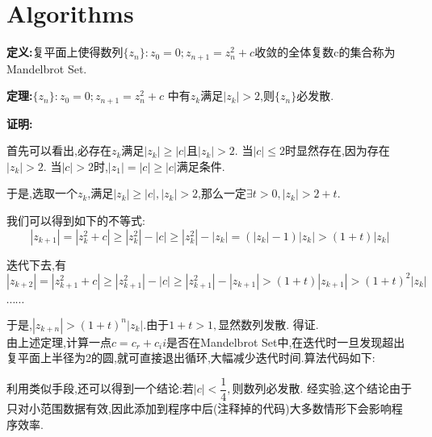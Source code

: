 \section{Algorithms}
\label{sec:algorithms}

{\bf 定义:}复平面上使得数列$ \{z_n\}: z_0 = 0; z_{n+1} = z_n^2 + c$收敛的全体复数c的集合称为Mandelbrot Set.

{\bf 定理:}$ \{z_n\}: z_0 = 0; z_{n+1} = z_n^2 + c $ 中有$ z_k $满足$ |z_k| > 2$,则$ \{ z_n\}$必发散.

{\bf 证明:}

首先可以看出,必存在$ z_k$满足$ |z_k| \ge |c|$且$ |z_k| > 2$. 当$ |c| \le 2$时显然存在,因为存在$ |z_k| > 2$.
当$ |c| > 2$时,$ |z_1| = |c| \ge |c|$满足条件.

于是,选取一个$ z_k$,满足$ |z_k| \ge |c|, |z_k| > 2$,那么一定$ \exists t > 0, |z_k| > 2 + t.$

我们可以得到如下的不等式:
\[ |z_{k+1}| = |z_k^2 + c| \ge |z_k^2| - |c| \ge |z_k^2| - |z_k| = (|z_k| - 1)|z_k| > (1 + t)|z_k| \]

迭代下去,有
\[ |z_{k+2}| = |z_{k+1}^2 + c| \ge |z_{k+1}^2| - |c| \ge |z_{k+1}^2| - |z_{k+1}| > (1+t)|z_{k+1}| > (1+t)^2|z_k|\]

$ \cdots \cdots$ 

于是,$ |z_{k+n}| > (1+t)^n|z_k|.$由于$ 1 + t > 1, $显然数列发散. 得证.
\\

由上述定理,计算一点$ c = c_r + c_ii$是否在Mandelbrot Set中,在迭代时一旦发现超出复平面上半径为2的圆,就可直接退出循环,大幅减少迭代时间.算法代码如下:

利用类似手段,还可以得到一个结论:若$ |c| < \dfrac{1}{4}, $则数列必发散.
经实验,这个结论由于只对小范围数据有效,因此添加到程序中后(注释掉的代码)大多数情形下会影响程序效率.
